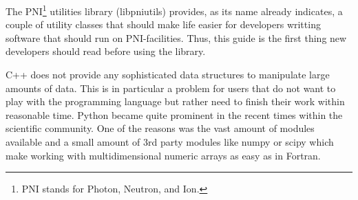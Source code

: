 

The PNI\footnote{PNI stands for Photon, Neutron, and Ion.} utilities library
(libpniutils) provides, as its name already indicates, a couple of utility 
classes that should make  life easier for developers writting 
software that should run on PNI-facilities. Thus, this guide is the first 
thing new developers should read before using the library. 

C++ does not provide any sophisticated data structures to manipulate large 
amounts of data. This is in particular a problem for users that do not 
want to play with the programming language but rather need to finish their 
work within reasonable time. 
Python became quite prominent in the recent times within the scientific 
community. One of the reasons was the vast amount of modules available and 
a small amount of 3rd party modules like numpy or scipy which make 
working with multidimensional numeric arrays as easy as in Fortran. 
